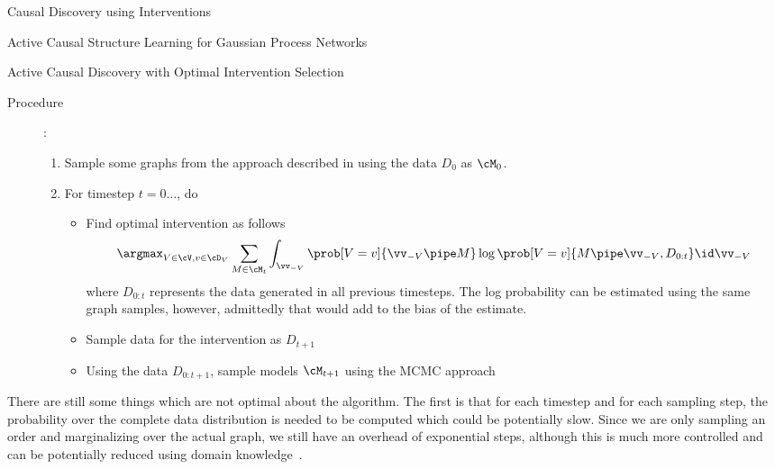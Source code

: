 \documentclass[10pt]{article}
\begin{document}
\begin{psection}[4]{Causal Discovery using Interventions}
\begin{psubsection}{Active Causal Structure Learning for Gaussian Process Networks}
\begin{algo}[0.9\textwidth]{Active Causal Discovery with Optimal Intervention Selection}
\begin{description}
                \item[Procedure]:
                    \begin{enumerate}
                        \item Sample some graphs from the approach described in
                            \citep{friedman2001} using the data $D_0$ as $\cM_0$.
                        \item For timestep $t = 0 \dots$, do
                            \begin{itemize}
                                \item Find optimal intervention as follows
                                    \begin{equation}%
                                        \label{eq:est_objective}
                                        \argmax_{V \in \cV, v \in \cD_V} \sum_{M \in \cM_t} \int_{\vv_{-V}} \prob[V = v]{\vv_{-V} \pipe M} \log \prob[V = v]{M \pipe \vv_{-V}, D_{0:t}} \id \vv_{-V}
                                    \end{equation}
                                    where $D_{0:t}$ represents the data generated in all
                                    previous timesteps. The log probability can be
                                    estimated using the same graph samples, however,
                                    admittedly that would add to the bias of the
                                    estimate.
                                \item Sample data for the intervention as $D_{t + 1}$
                                \item Using the data $D_{0:t+1}$, sample models
                                    $\cM_{t + 1}$ using the MCMC approach
                            \end{itemize}
                    \end{enumerate}
                    
            \end{description}
        
        \end{algo}

        There are still some things which are not optimal about the algorithm. The first
        is that for each timestep and for each sampling step, the probability over the
        complete data distribution is needed to be computed which could be potentially
        slow. Since we are only sampling an order and marginalizing over the actual
        graph, we still have an overhead of exponential steps, although this is much
        more controlled and can be potentially reduced using domain
        knowledge~\cite{friedman2001}.


\end{psubsection}
\end{psection}
\end{document}
